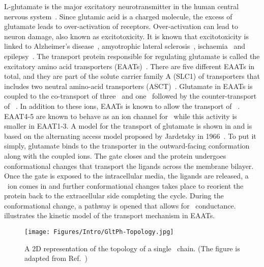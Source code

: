 L-glutamate is the major excitatory neurotransmitter in the human central nervous 
system~\cite{Danbolt2001}. Since glutamic acid is a charged molecule, the excess of glutamate 
leads to over-activation of receptors. Over-activation can lead to neuron damage, also known as 
excitotoxicity. It is known that excitotoxicity is linked to Alzheimer’s disease~\cite{Hynd2004}, 
amyotrophic lateral sclerosis~\cite{Rothstein1992}, ischaemia~\cite{Rossi2000} and 
epilepsy~\cite{During1993}. The transport protein responsible for regulating glutamate is called 
the excitatory amino acid transporters (EAATs)~\cite{Danbolt2001}. There are five different EAATs 
in total, and they are part of the solute carrier family A (SLC1) of transporters that includes 
two neutral amino-acid transporters (ASCT)~\cite{Arriza1993}. Glutamate in EAATs is coupled to 
the co-transport of three \Na\ and one \Hi\ followed by the counter-transport of 
\K~\cite{Levy1998,Owe2006}. In addition to these ions, EAATs is known to allow the transport of 
\Cl~\cite{Fairman1995}. EAAT4-5 are known to behave as an ion channel for \Cl\ while this activity 
is smaller in EAAT1-3. A model for the transport of glutamate is shown in  
and is based on the alternating access model proposed by Jardetsky in 1966~\cite{Jardetzky1966}. 
To put it simply, glutamate binds to the transporter in the outward-facing conformation along with 
the coupled ions. The gate closes and the protein undergoes conformational changes that transport 
the ligands across the membrane bilayer. Once the gate is exposed to the intracellular media, 
the ligands are released, a \K\ ion comes in and further conformational changes takes place to 
reorient the protein back to the extracellular side completing the cycle. During the conformational 
change, a pathway is opened that allows for \Cl\ conductance.  
illustrates the kinetic model of the transport mechanism in EAATs.

\begin{figure}[b!]
\centering
\texttt{[image: Figures/Intro/GltPh-Topology.jpg]}
\caption{A 2D representation of the topology of a single \GltPh\ chain. 
(The figure is adapted from Ref.~\cite{Vandenberg2013})}
\label{intro:glttop}
\end{figure}

